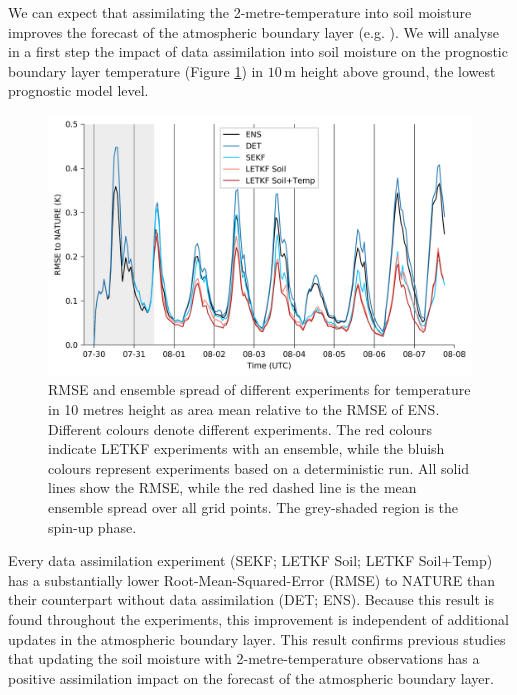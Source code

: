 \documentclass[hess, manuscript]{copernicus}
\begin{document}
We can expect that assimilating the 2-metre-temperature into soil moisture improves the forecast of the atmospheric boundary layer (e.g. \citet{carrera_assimilation_2019}). 
We will analyse in a first step the impact of data assimilation into soil moisture on the prognostic boundary layer temperature (Figure \ref{fig:err_t_long}) in $10\,\text{m}$ height above ground, the lowest prognostic model level.

\begin{figure}[ht]
	\includegraphics[width=\textwidth]{figures/fig_04_err_t_long.png}
	\caption{
		RMSE and ensemble spread of different experiments for temperature in 10 metres height as area mean relative to the RMSE of ENS.
		Different colours denote different experiments.
		The red colours indicate LETKF experiments with an ensemble, while the bluish colours represent experiments based on a deterministic run.
		All solid lines show the RMSE, while the red dashed line is the mean ensemble spread over all grid points.
		The grey-shaded region is the spin-up phase.
	}
	\label{fig:err_t_long}
\end{figure}

Every data assimilation experiment (SEKF; LETKF Soil; LETKF Soil+Temp) has a substantially lower Root-Mean-Squared-Error (RMSE) to NATURE than their counterpart without data assimilation (DET; ENS).
Because this result is found throughout the experiments, this improvement is independent of additional updates in the atmospheric boundary layer.
This result confirms previous studies that updating the soil moisture with 2-metre-temperature observations has a positive assimilation impact on the forecast of the atmospheric boundary layer.
\end{document}

